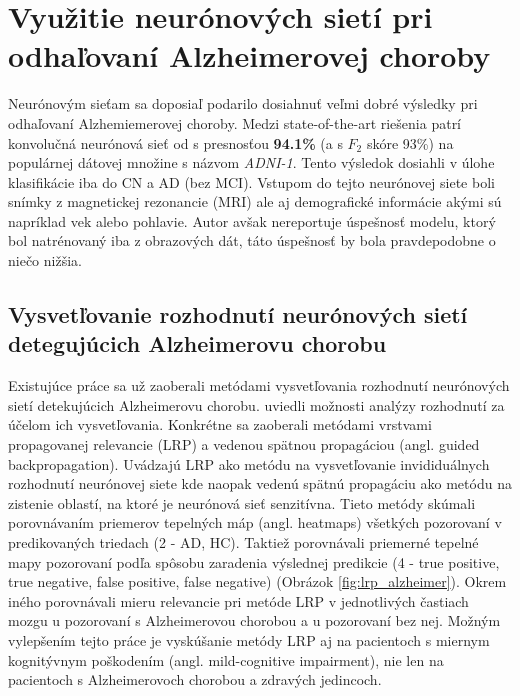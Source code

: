 \section{Využitie neurónových sietí pri odhaľovaní Alzheimerovej choroby \label{sec:nn_ad_prediction}}

Neurónovým sieťam sa doposiaľ podarilo dosiahnuť veľmi dobré výsledky pri odhaľovaní Alzhemiemerovej choroby. Medzi state-of-the-art riešenia patrí konvolučná neurónová sieť od \citeauthor*{esmaeilzadeh2018end} s presnosťou \textbf{94.1\%} (a s $F_2$ skóre 93\%) na populárnej dátovej množine s názvom \textit{ADNI-1}. Tento výsledok dosiahli v úlohe klasifikácie iba do CN a AD (bez MCI). Vstupom do tejto neurónovej siete boli snímky z magnetickej rezonancie (MRI) ale aj demografické informácie akými sú napríklad vek alebo pohlavie. Autor avšak nereportuje úspešnosť modelu, ktorý bol natrénovaný iba z obrazových dát, táto úspešnosť by bola pravdepodobne o niečo nižšia. 

\subsection{Vysvetľovanie rozhodnutí neurónových sietí detegujúcich Alzheimerovu chorobu}

Existujúce práce sa už zaoberali metódami vysvetľovania rozhodnutí neurónových sietí detekujúcich Alzheimerovu chorobu. \citeauthor{bohle2019layer} uviedli možnosti analýzy rozhodnutí za účelom ich vysvetľovania. Konkrétne sa zaoberali metódami vrstvami propagovanej relevancie (LRP) a vedenou spätnou propagáciou (angl. guided backpropagation). Uvádzajú LRP ako metódu na vysvetľovanie invididuálnych rozhodnutí neurónovej siete kde naopak vedenú spätnú propagáciu ako metódu na zistenie oblastí, na ktoré je neurónová sieť senzitívna. Tieto metódy skúmali porovnávaním priemerov tepelných máp (angl. heatmaps) všetkých pozorovaní v predikovaných triedach (2 - AD, HC). Taktiež porovnávali priemerné tepelné mapy pozorovaní podľa spôsobu zaradenia výslednej predikcie (4 - true positive, true negative, false positive, false negative) (Obrázok \ref{fig:lrp_alzheimer}). Okrem iného porovnávali mieru relevancie pri metóde LRP v jednotlivých častiach mozgu u pozorovaní s Alzheimerovou chorobou a u pozorovaní bez nej. Možným vylepšením tejto práce je vyskúšanie metódy LRP aj na pacientoch s miernym kognitývnym poškodením (angl. mild-cognitive impairment), nie len na pacientoch s Alzheimerovoch chorobou a zdravých jedincoch.


